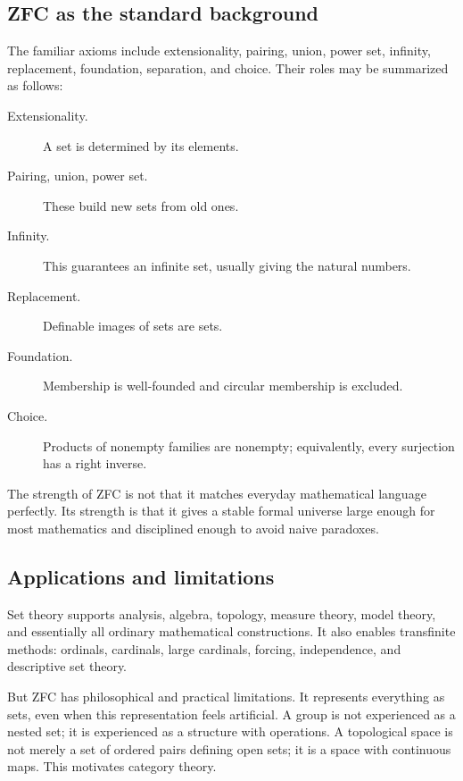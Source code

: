 \subsection{ZFC as the standard background}

The familiar axioms include extensionality, pairing, union, power set, infinity, replacement, foundation, separation, and choice.  Their roles may be summarized as follows:
\begin{description}
  \item[Extensionality.] A set is determined by its elements.
  \item[Pairing, union, power set.] These build new sets from old ones.
  \item[Infinity.] This guarantees an infinite set, usually giving the natural numbers.
  \item[Replacement.] Definable images of sets are sets.
  \item[Foundation.] Membership is well-founded and circular membership is excluded.
  \item[Choice.] Products of nonempty families are nonempty; equivalently, every surjection has a right inverse.
\end{description}

\begin{remark}
The strength of ZFC is not that it matches everyday mathematical language perfectly.  Its strength is that it gives a stable formal universe large enough for most mathematics and disciplined enough to avoid naive paradoxes.
\end{remark}

\subsection{Applications and limitations}

Set theory supports analysis, algebra, topology, measure theory, model theory, and essentially all ordinary mathematical constructions.  It also enables transfinite methods: ordinals, cardinals, large cardinals, forcing, independence, and descriptive set theory.

But ZFC has philosophical and practical limitations.  It represents everything as sets, even when this representation feels artificial.  A group is not experienced as a nested set; it is experienced as a structure with operations.  A topological space is not merely a set of ordered pairs defining open sets; it is a space with continuous maps.  This motivates category theory.

